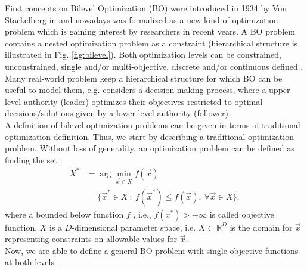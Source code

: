 \documentclass[conference]{IEEEtran}
\theoremstyle{definition}
\begin{document}
First concepts on Bilevel Optimization (BO) were introduced in 1934 by Von Stackelberg
in \cite{von2010market}  and nowadays was formalized as a new kind of optimization
problem which is gaining interest by researchers in recent years. A BO problem
contains a nested optimization problem as a constraint (hierarchical structure is
illustrated in Fig. \ref{fig:bilevel}). Both optimization levels can be constrained,
unconstrained, single and/or multi-objective, discrete and/or continuous defined
\cite{bard2013practical,dempe2002foundations}. Many real-world problem keep a
hierarchical structure for which BO can be useful to model them, e.g. considers
a decision-making process, where a upper level authority (leader) optimizes their
objectives restricted to optimal decisions/solutions given by a  lower level authority (follower)
\cite{brotcorne2001bilevel,kalashnikov2010comparison,sinha2015transportation,von1945theory,wang2014bilevel}.\\

A definition of bilevel optimization problems can be given in terms of traditional
optimization definition. Thus, we start by describing a traditional optimization
problem. Without loss of generality, an optimization problem can be defined as
finding the set \cite{chong2013introduction,rao2009engineering}:
% 
\begin{align}
    \label{eqn:Xargmin}
    X^* &= \arg \min_{\vec{x} \in X} f(\vec{x}) \\ \nonumber
    &= \{ \vec{x}^* \in X \ : \ f(\vec{x}^*) \leq f( \vec{x} ), \ 
    \forall
    \vec{x} \in X \},
\end{align}
% 
where a bounded below function $f$ , i.e., $f(x^*)> -\infty$ is called objective
function. $X$ is a $D$-dimensional parameter space, i.e. $X \subset \mathbb{R}^D$
is the domain for $\vec{x}$ representing constraints on
allowable values for $\vec{x}$.\\

Now, we are able to define a general BO problem with
single-objective functions at both levels
\cite{bard2013practical,dempe2002foundations}.%
\end{document}
